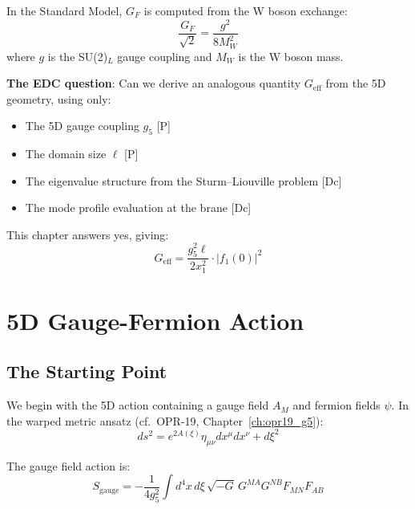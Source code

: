 In the Standard Model, $G_F$ is computed from the W boson exchange:
\begin{equation}
    \frac{G_F}{\sqrt{2}} = \frac{g^2}{8 M_W^2}
    \label{eq:ch19_gf_sm}
\end{equation}
where $g$ is the SU(2)$_L$ gauge coupling and $M_W$ is the W boson mass.

\textbf{The EDC question}: Can we derive an analogous quantity $G_{\text{eff}}$ from the
5D geometry, using only:
\begin{itemize}
    \item The 5D gauge coupling $g_5$ [P]
    \item The domain size $\ell$ [P]
    \item The eigenvalue structure from the Sturm--Liouville problem [Dc]
    \item The mode profile evaluation at the brane [Dc]
\end{itemize}

This chapter answers yes, giving:
\begin{equation}
    \boxed{G_{\text{eff}} = \frac{g_5^2 \ell}{2 x_1^2} \cdot |f_1(0)|^2}
    \label{eq:ch19_geff_preview}
\end{equation}


\section{5D Gauge-Fermion Action}
\label{sec:ch19_5d_action}

\subsection{The Starting Point}

We begin with the 5D action containing a gauge field $A_M$ and fermion fields $\psi$.
In the warped metric ansatz (cf.\ OPR-19, Chapter~\ref{ch:opr19_g5}):
\begin{equation}
    ds^2 = e^{2A(\xi)} \eta_{\mu\nu} dx^\mu dx^\nu + d\xi^2
    \label{eq:ch19_warped_metric}
\end{equation}

The gauge field action is:
\begin{equation}
    S_{\text{gauge}} = -\frac{1}{4g_5^2} \int d^4x \, d\xi \, \sqrt{-G} \,
    G^{MA} G^{NB} F_{MN} F_{AB}
    \label{eq:ch19_gauge_action}
\end{equation}

